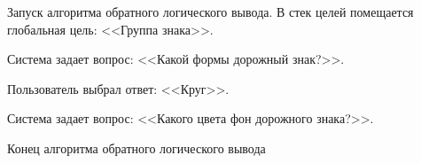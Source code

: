 Запуск алгоритма обратного логического вывода. В стек целей помещается глобальная цель: <<Группа знака>>.

Система задает вопрос: <<Какой формы дорожный знак?>>.

Пользователь выбрал ответ: <<Круг>>.

Система задает вопрос: <<Какого цвета фон дорожного знака?>>.

Конец алгоритма обратного логического вывода

